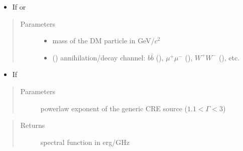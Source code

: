\documentclass[letterpaper,10pt,english]{sphinxmanual}
\begin{document}
\begin{fulllineitems}
\begin{DUlineblock}{0em}
\item[] 
\end{DUlineblock}
\begin{itemize}
\item {} 
\sphinxAtStartPar
If  or 

\end{itemize}
\begin{quote}\begin{description}
\item[{Parameters}] \leavevmode\begin{itemize}
\item {} 
\sphinxAtStartPar
{} \textendash{} mass of the DM particle in GeV/\(c^2\)

\item {} 
\sphinxAtStartPar
{} () \textendash{} annihilation/decay channel: \(b\bar b\) (), \(\mu^+ \mu^-\) (), \(W^+ W^-\) (), etc.

\end{itemize}

\end{description}\end{quote}
\begin{itemize}
\item {} 
\sphinxAtStartPar
If 

\end{itemize}
\begin{quote}\begin{description}
\item[{Parameters}] \leavevmode
\sphinxAtStartPar
{} \textendash{} power\sphinxhyphen{}law exponent of the generic CRE source (\(1.1 < \Gamma < 3\))

\end{description}\end{quote}

\begin{DUlineblock}{0em}
\item[] 
\end{DUlineblock}
\begin{quote}\begin{description}
\item[{Returns}] \leavevmode
\sphinxAtStartPar
spectral function in erg/GHz

\end{description}\end{quote}

\end{fulllineitems}
\end{document}
